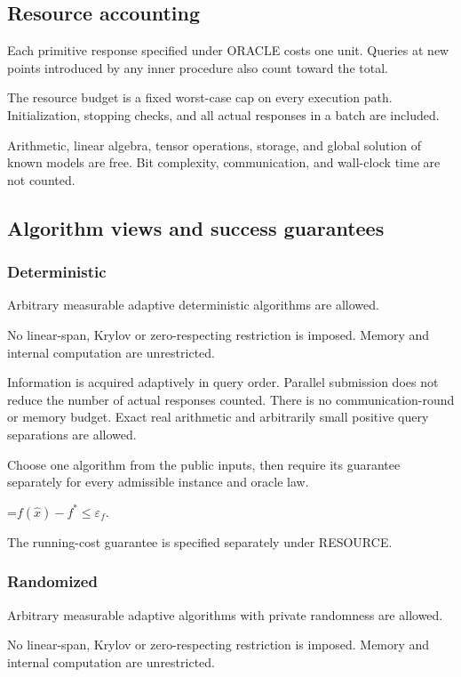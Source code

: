\documentclass[10pt,a4paper]{article}
\newcommand{\AtlasMath}[1]{\par\begingroup\centering\setbox0=\hbox{$\displaystyle #1$}\ifdim\wd0>1.4\linewidth\typeout{ATLAS WIDE FORMULA: \the\wd0}\fi\ifdim\wd0>\linewidth\resizebox{\linewidth}{!}{\box0}\else\box0\fi\par\endgroup}
\begin{document}
\subsection{Resource accounting}
Each primitive response specified under ORACLE costs one unit. Queries at new points introduced by any inner procedure also count toward the total.

The resource budget is a fixed worst-case cap on every execution path. Initialization, stopping checks, and all actual responses in a batch are included.

Arithmetic, linear algebra, tensor operations, storage, and global solution of known models are free. Bit complexity, communication, and wall-clock time are not counted.

\subsection{Algorithm views and success guarantees}
\subsubsection{Deterministic}
Arbitrary measurable adaptive deterministic algorithms are allowed.

No linear-span, Krylov or zero-respecting restriction is imposed. Memory and internal computation are unrestricted.

Information is acquired adaptively in query order. Parallel submission does not reduce the number of actual responses counted. There is no communication-round or memory budget. Exact real arithmetic and arbitrarily small positive query separations are allowed.

Choose one algorithm from the public inputs, then require its guarantee separately for every admissible instance and oracle law.


\AtlasMath{f(\widehat{x})-f^*\le \varepsilon_f.}


The running-cost guarantee is specified separately under RESOURCE.

\subsubsection{Randomized}
Arbitrary measurable adaptive algorithms with private randomness are allowed.

No linear-span, Krylov or zero-respecting restriction is imposed. Memory and internal computation are unrestricted.
\end{document}
